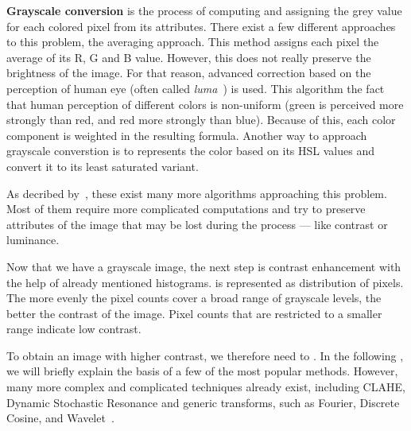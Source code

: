 \textbf{Grayscale conversion}  is the process of computing and assigning the grey value for each colored pixel from its attributes. There exist a few different approaches to this problem,  the averaging approach. This method assigns each pixel the average of its R, G and B value. However, this does not really preserve the brightness of the image. For that reason, advanced correction based on the perception of human eye (often called \emph{luma}~\cite{grayscaleConv}) is used. This algorithm   the fact that human perception of different colors is non-uniform (green  is perceived more strongly than red, and red more strongly than blue). Because of this, each color component is weighted in the resulting formula. Another way to approach grayscale converstion is to represents the color based on its HSL values and convert it to its least saturated variant.

As decribed by~\citet{grayscaleCadik}, these exist many more algorithms approaching this problem. Most of them require more complicated computations and try to preserve attributes of the image that may be lost during the process --- like contrast or luminance.

Now that we have a grayscale image, the next step is contrast enhancement  with the help of already mentioned histograms.  is represented as distribution of pixels. The more evenly the pixel counts cover a broad range of grayscale levels, the better the contrast of the image. Pixel counts that are restricted to a smaller range indicate low contrast.

To obtain an image with higher contrast, we therefore need to . In the following , we will briefly explain the basis of a few of the most popular methods. However, many more complex and complicated techniques already exist, including CLAHE, Dynamic Stochastic Resonance and generic transforms, such as Fourier, Discrete Cosine, and Wavelet~\cite{contrastOther}.

